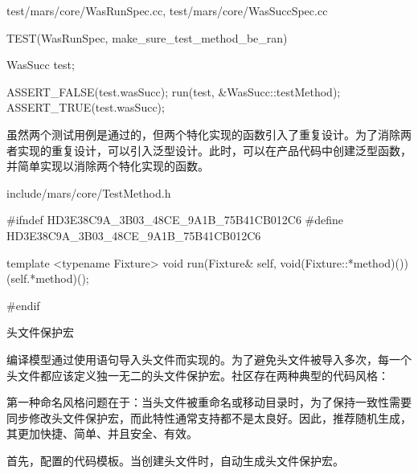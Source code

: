 \begin{content}
\begin{diff}{test/mars/core/WasRunSpec.cc, test/mars/core/WasSuccSpec.cc}
\begin{minicpp}
TEST(WasRunSpec, make_sure_test_method_be_ran) {
  WasSucc test;

  ASSERT_FALSE(test.wasSucc);
  run(test, &WasSucc::testMethod);
  ASSERT_TRUE(test.wasSucc);
}
\end{minicpp}
\end{diff}

虽然两个测试用例是通过的，但两个特化实现的函数引入了重复设计。为了消除两者实现的重复设计，可以引入泛型设计。此时，可以在产品代码中创建泛型函数，并简单实现以消除两个特化实现的函数。

\begin{nodiff}{include/mars/core/TestMethod.h}
\begin{c++}
#ifndef HD3E38C9A_3B03_48CE_9A1B_75B41CB012C6
#define HD3E38C9A_3B03_48CE_9A1B_75B41CB012C6

template <typename Fixture>
void run(Fixture& self, void(Fixture::*method)()) {
  (self.*method)();
}

#endif
\end{c++}
\end{nodiff}

\begin{episode}{头文件保护宏}

\begin{content}

编译模型通过使用语句导入头文件而实现的。为了避免头文件被导入多次，每一个头文件都应该定义独一无二的头文件保护宏。社区存在两种典型的代码风格：

\begin{enum}
\end{enum}

第一种命名风格问题在于：当头文件被重命名或移动目录时，为了保持一致性需要同步修改头文件保护宏，而此特性通常支持都不是太良好。因此，推荐随机生成，其更加快捷、简单、并且安全、有效。

首先，配置的代码模板。当创建头文件时，自动生成头文件保护宏。


\end{content}
\end{episode}
\end{content}
